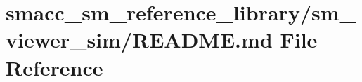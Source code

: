 \hypertarget{smacc__sm__reference__library_2sm__viewer__sim_2README_8md}{}\section{smacc\+\_\+sm\+\_\+reference\+\_\+library/sm\+\_\+viewer\+\_\+sim/\+R\+E\+A\+D\+ME.md File Reference}
\label{smacc__sm__reference__library_2sm__viewer__sim_2README_8md}
